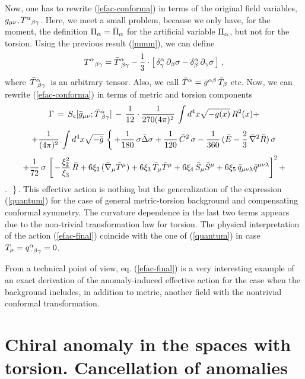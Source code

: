 Now, one has to rewrite (\ref{efac-conforma}) in
terms of the original field variables, $g_{\mu\nu}, {T^\alpha}_{\beta\gamma}$.
Here, we meet a small problem, because we only have, for the moment,
the definition $\Pi_\alpha = {\bar \Pi}_\alpha$ for the artificial variable
$\Pi_\alpha$, but not for the torsion. Using the previous result
(\ref{mmm}), we can define
$$ 
 {T^\alpha}_{\beta\gamma} = {{\bar T}^\alpha}_{\,\,\beta\gamma}
-\frac{1}{3}\cdot\left[\,\delta^\alpha_\gamma\,\partial_\beta\sigma -
\delta^\alpha_\beta\,\partial_\gamma\sigma\,\right]\,, 
$$ 
where
$\,{{\bar T}^\alpha}_{\,\,\beta\gamma}\,$ is an arbitrary tensor. Also, we
call ${\bar T}^\alpha = {\bar g}^{\alpha\beta}\,{\bar T}_\beta$ etc. Now, we
can rewrite (\ref{efac-conforma}) in terms of 
metric and torsion components
$$ 
{\Gamma}\, = \,S_c[{\bar g}_{\mu\nu}; {{\bar T}^\alpha}_{\,\,\beta\gamma}]
\,- \,\frac{1}{12}\cdot\frac{1}{270 (4\pi)^2}\,\int d^4 x \sqrt{-g
(x)}\,R^2(x) + 
$$$$ 
+ \frac{1}{(4\pi)^2}\, \int d^4 x\sqrt{-{\bar
g}}\,\left\{ \,+ \frac{1}{180}\,\sigma {\bar {\Delta}}\sigma +
\frac{1}{120}\,{\bar C}^2\,\sigma - \frac{1}{360}\,({\bar E} -
\frac23\,{\bar {\nabla}}^2 {\bar R})\,\sigma \right. 
$$$$ 
\left. +
\frac{1}{72}\,\sigma\,\left[ \,-\frac{\xi^2_2}{\xi_3}\,{\bar R} +
6\xi_2\,({\bar {\nabla}}_\mu {\bar T}^\mu) + 6\xi_3\,{\bar T}_\mu {\bar
T}^\mu  + 6\xi_4\, {\bar S}_{\mu}{\bar S}^{\mu} + 6\xi_5\,{\bar
q}_{\mu\nu\lambda}{\bar q}^{\mu\nu\lambda} \right]^2 + \right. 
$$ 
\beq
\left. \,\cdot {}\,\right\}\,. 
\label{efac-final} 
\eeq 
This
effective action is nothing but the generalization of the 
expression (\ref{quantum}) for the case of general
metric-torsion background and compensating conformal symmetry.
The curvature dependence in the last two terms appears
due to the non-trivial transformation law for torsion.
The physical interpretation of the action (\ref{efac-final})
coincide with the one of (\ref{quantum}) in case 
$T_\mu=q^\alpha_{\,\cdot\,\beta\gamma}=0$.  

From a technical point of view, eq. (\ref{efac-final}) is a very 
interesting example of an exact derivation of the anomaly-induced 
effective action for the case when the background 
includes, in addition to metric, another field with the
nontrivial conformal transformation. 

\section{Chiral anomaly in the spaces with torsion.
Cancellation of anomalies}

